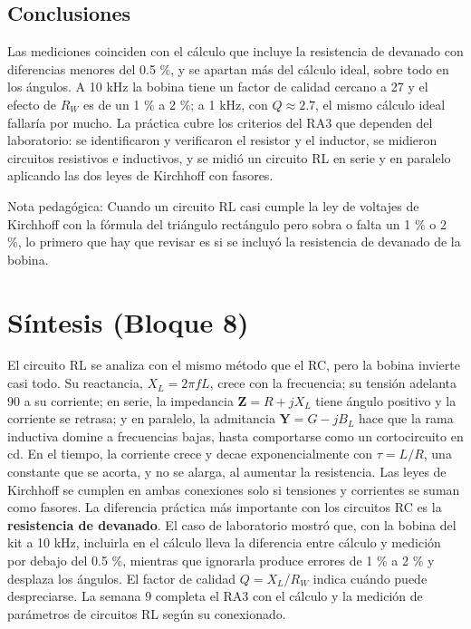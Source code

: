 \documentclass[11pt,letterpaper]{article}
\begin{document}
\subsection{Conclusiones}

Las mediciones coinciden con el cálculo que incluye la resistencia de devanado con diferencias menores del 0.5 \%, y se apartan más del cálculo ideal, sobre todo en los ángulos. A 10 kHz la bobina tiene un factor de calidad cercano a 27 y el efecto de $R_W$ es de un 1 \% a 2 \%; a 1 kHz, con $Q \approx 2.7$, el mismo cálculo ideal fallaría por mucho. La práctica cubre los criterios del RA3 que dependen del laboratorio: se identificaron y verificaron el resistor y el inductor, se midieron circuitos resistivos e inductivos, y se midió un circuito RL en serie y en paralelo aplicando las dos leyes de Kirchhoff con fasores.

\begin{nota}{Nota pedagógica:}
Cuando un circuito RL \guillemotleft{}casi\guillemotright{} cumple la ley de voltajes de Kirchhoff con la fórmula del triángulo rectángulo pero sobra o falta un 1 \% o 2 \%, lo primero que hay que revisar es si se incluyó la resistencia de devanado de la bobina.
\end{nota}

\section{Síntesis (Bloque 8)}

El circuito RL se analiza con el mismo método que el RC, pero la bobina invierte casi todo. Su reactancia, $X_L = 2\pi f L$, crece con la frecuencia; su tensión adelanta 90\textdegree{} a su corriente; en serie, la impedancia $\mathbf{Z} = R + jX_L$ tiene ángulo positivo y la corriente se retrasa; y en paralelo, la admitancia $\mathbf{Y} = G - jB_L$ hace que la rama inductiva domine a frecuencias bajas, hasta comportarse como un cortocircuito en cd. En el tiempo, la corriente crece y decae exponencialmente con $\tau = L/R$, una constante que se acorta, y no se alarga, al aumentar la resistencia. Las leyes de Kirchhoff se cumplen en ambas conexiones solo si tensiones y corrientes se suman como fasores. La diferencia práctica más importante con los circuitos RC es la \textbf{resistencia de devanado}. El caso de laboratorio mostró que, con la bobina del kit a 10 kHz, incluirla en el cálculo lleva la diferencia entre cálculo y medición por debajo del 0.5 \%, mientras que ignorarla produce errores de 1 \% a 2 \% y desplaza los ángulos. El factor de calidad $Q = X_L/R_W$ indica cuándo puede despreciarse. La semana 9 completa el RA3 con el cálculo y la medición de parámetros de circuitos RL según su conexionado.
\end{document}
